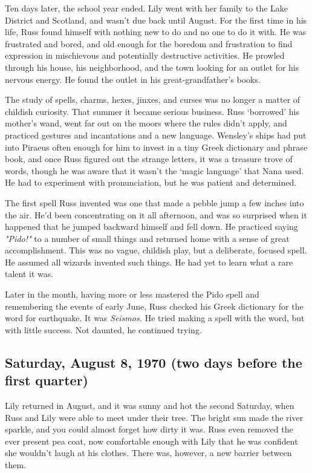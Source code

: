 Ten days later, the school year ended. Lily went with her family to the Lake District and Scotland, and wasn't due back until August. For the first time in his life, Russ found himself with nothing new to do and no one to do it with. He was frustrated and bored, and old enough for the boredom and frustration to find expression in mischievous and potentially destructive activities. He prowled through his house, his neighborhood, and the town looking for an outlet for his nervous energy. He found the outlet in his great-grandfather's books.

The study of spells, charms, hexes, jinxes, and curses was no longer a matter of childish curiosity. That summer it became serious business. Russ `borrowed' his mother's wand, went far out on the moors where the rules didn't apply, and practiced gestures and incantations and a new language. Wensley's ships had put into Piraeus often enough for him to invest in a tiny Greek dictionary and phrase book, and once Russ figured out the strange letters, it was a treasure trove of words, though he was aware that it wasn't the `magic language' that Nana used. He had to experiment with pronunciation, but he was patient and determined.

The first spell Russ invented was one that made a pebble jump a few inches into the air. He'd been concentrating on it all afternoon, and was so surprised when it happened that he jumped backward himself and fell down. He practiced saying \emph{"Pido!"} to a number of small things and returned home with a sense of great accomplishment. This was no vague, childish play, but a deliberate, focused spell. He assumed all wizards invented such things. He had yet to learn what a rare talent it was.

Later in the month, having more or less mastered the Pido spell and remembering the events of early June, Russ checked his Greek dictionary for the word for earthquake. It was \emph{Seismos.} He tried making a spell with the word, but with little success. Not daunted, he continued trying.

\subsection{Saturday, August 8, 1970 (two days before the first quarter)}

Lily returned in August, and it was sunny and hot the second Saturday, when Russ and Lily were able to meet under their tree. The bright sun made the river sparkle, and you could almost forget how dirty it was. Russ even removed the ever present pea coat, now comfortable enough with Lily that he was confident she wouldn't laugh at his clothes. There was, however, a new barrier between them.

